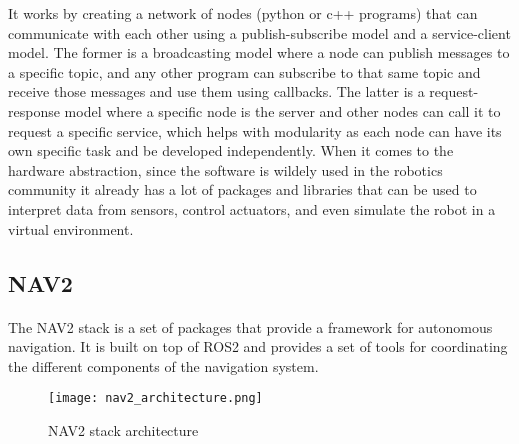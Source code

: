 It works by creating a network of nodes (python or c++ programs) that can communicate with each other 
using a publish-subscribe model and a service-client model. The former is a broadcasting 
model where a node can publish messages to a specific topic, and any other 
program can subscribe to that same topic and receive those messages and use them using callbacks. 
The latter is a request-response model where a specific node is the server and other 
nodes can call it to request a specific service, which helps with modularity 
as each node can have its own specific task and be developed independently. When it comes to 
the hardware abstraction, since the software is wildely used in the robotics community 
it already has a lot of packages and libraries that can be used to interpret data from 
sensors, control actuators, and even simulate the robot in a virtual environment.


\subsection{NAV2}
\label{subsec:navigation2}
\paragraph{}The \gls{NAV2} stack is a set of packages that provide a framework for autonomous navigation. 
It is built on top of \gls{ROS2} and provides a set of tools for coordinating the different components of 
the navigation system.
\begin{figure}[h]
    \centering
    \texttt{[image: nav2\_architecture.png]}
    \caption{NAV2 stack architecture \cite{nav2_architecture}}
    \label{fig:nav2_stack}
\end{figure}

